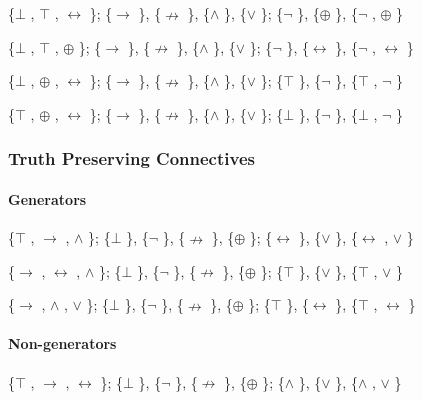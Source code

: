 \{$\bot$ , $\top$ , $\leftrightarrow$ \}; \{$\to$ \}, \{$\nrightarrow$ \}, \{$\land$ \}, \{$\lor$ \}; \{$\neg$ \}, \{$\oplus$ \}, \{$\neg$ , $\oplus$ \}

\{$\bot$ , $\top$ , $\oplus$ \}; \{$\to$ \}, \{$\nrightarrow$ \}, \{$\land$ \}, \{$\lor$ \}; \{$\neg$ \}, \{$\leftrightarrow$ \}, \{$\neg$ , $\leftrightarrow$ \}

\{$\bot$ , $\oplus$ , $\leftrightarrow$ \}; \{$\to$ \}, \{$\nrightarrow$ \}, \{$\land$ \}, \{$\lor$ \}; \{$\top$ \}, \{$\neg$ \}, \{$\top$ , $\neg$ \}

\{$\top$ , $\oplus$ , $\leftrightarrow$ \}; \{$\to$ \}, \{$\nrightarrow$ \}, \{$\land$ \}, \{$\lor$ \}; \{$\bot$ \}, \{$\neg$ \}, \{$\bot$ , $\neg$ \}

\hypertarget{truth-preserving-connectives}{%
\subsubsection{Truth Preserving
Connectives}\label{truth-preserving-connectives}}

\hypertarget{generators-2}{%
\paragraph{Generators}\label{generators-2}}

\{$\top$ , $\to$ , $\land$ \}; \{$\bot$ \}, \{$\neg$ \}, \{$\nrightarrow$ \}, \{$\oplus$ \}; \{$\leftrightarrow$ \}, \{$\lor$ \}, \{$\leftrightarrow$ , $\lor$ \}

\{$\to$ , $\leftrightarrow$ , $\land$ \}; \{$\bot$ \}, \{$\neg$ \}, \{$\nrightarrow$ \}, \{$\oplus$ \}; \{$\top$ \}, \{$\lor$ \}, \{$\top$ , $\lor$ \}

\{$\to$ , $\land$ , $\lor$ \}; \{$\bot$ \}, \{$\neg$ \}, \{$\nrightarrow$ \}, \{$\oplus$ \}; \{$\top$ \}, \{$\leftrightarrow$ \}, \{$\top$ , $\leftrightarrow$ \}

\hypertarget{non-generators-2}{%
\paragraph{Non-generators}\label{non-generators-2}}

\{$\top$ , $\to$ , $\leftrightarrow$ \}; \{$\bot$ \}, \{$\neg$ \}, \{$\nrightarrow$ \}, \{$\oplus$ \}; \{$\land$ \}, \{$\lor$ \}, \{$\land$ , $\lor$ \}

